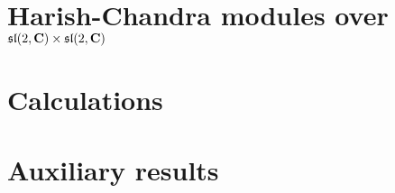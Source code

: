 \documentclass[]{./Bachelor}
\begin{document}
\frontmatter




\tableofcontents*

\mainmatter
\clearpage
\pagestyle{ruled}

\chapter{Harish-Chandra modules over \texorpdfstring{$\mathfrak{sl}(2,\mathbf{C})\times \mathfrak{sl}(2,\mathbf{C})$}{sl(2,C) x sl(2,C)}}\nocite{*}
\label{cha:first}












\medskip

\printbibliography


\appendix

\chapter{Calculations}



















\chapter{Auxiliary results}






\end{document}
